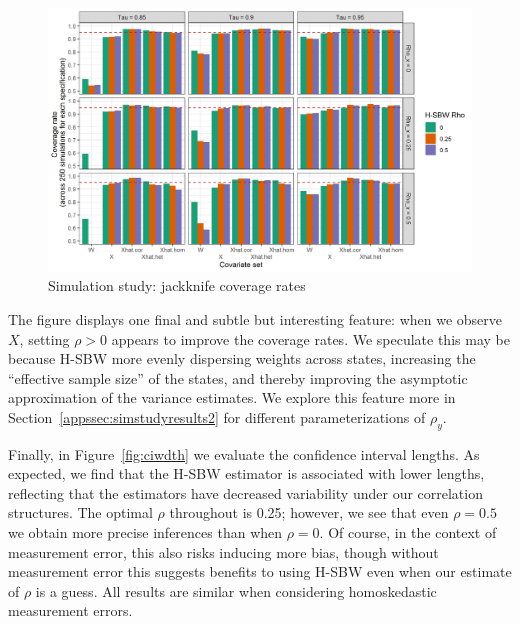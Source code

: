 \begin{figure}[H]
\begin{center}
    \caption{Simulation study: jackknife coverage rates}\label{fig:simcoverage1}
    \includegraphics[scale=0.5]{01_Plots/coverage-plot-1.png}
\end{center}
\end{figure}

The figure displays one final and subtle but interesting feature: when we observe $X$, setting $\rho > 0$ appears to improve the coverage rates. We speculate this may be because H-SBW more evenly dispersing weights across states, increasing the ``effective sample size'' of the states, and thereby improving the asymptotic approximation of the variance estimates. We explore this feature more in Section~\ref{appssec:simstudyresults2} for different parameterizations of $\rho_y$. 

Finally, in Figure~\ref{fig:ciwdth} we evaluate the confidence interval lengths. As expected, we find that the H-SBW estimator is associated with lower lengths, reflecting that the estimators have decreased variability under our correlation structures. The optimal $\rho$ throughout is 0.25; however, we see that even $\rho = 0.5$ we obtain more precise inferences than when $\rho = 0$. Of course, in the context of measurement error, this also risks inducing more bias, though without measurement error this suggests benefits to using H-SBW even when our estimate of $\rho$ is a guess. All results are similar when considering homoskedastic measurement errors. 

